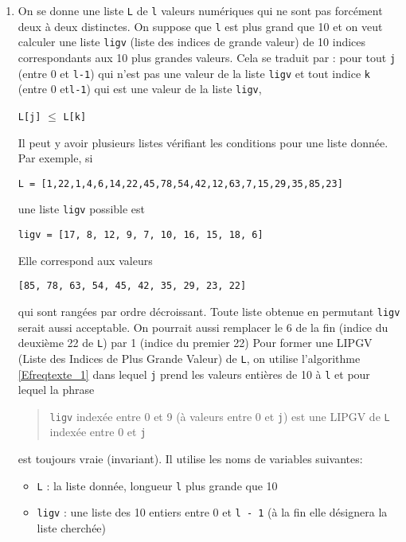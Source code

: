 \begin{enumerate}
  \item On se donne une liste \texttt{L} de \texttt{l} valeurs numériques qui ne sont pas forcément deux à deux distinctes. On suppose que \texttt{l} est plus grand que 10 et on veut calculer une liste \texttt{ligv} (liste des indices de grande valeur) de 10 indices correspondants aux 10 plus grandes valeurs. \newline
  Cela se traduit par : pour tout \texttt{j} (entre 0 et \texttt{l-1}) qui n'est pas une valeur de la liste \texttt{ligv} et tout indice \texttt{k} (entre 0 et\texttt{l-1}) qui est une valeur de la liste \texttt{ligv}, 
  \begin{center}
    \texttt{L[j]} $\leq$ \texttt{L[k]} 
  \end{center}
Il peut y avoir plusieurs listes vérifiant les conditions pour une liste donnée. Par exemple, si
\begin{center}
  \verb|L = [1,22,1,4,6,14,22,45,78,54,42,12,63,7,15,29,35,85,23]|  
\end{center}
une liste \texttt{ligv} possible est
\begin{center}
  \verb|ligv = [17, 8, 12, 9, 7, 10, 16, 15, 18, 6]|
\end{center}
Elle correspond aux valeurs
\begin{center}
\verb|[85, 78, 63, 54, 45, 42, 35, 29, 23, 22]|  
\end{center}
qui sont rangées par ordre décroissant.\newline
Toute liste obtenue en permutant \texttt{ligv} serait aussi acceptable. On pourrait aussi remplacer le 6 de la fin (indice du deuxième 22 de \texttt{L}) par 1 (indice du premier 22)\newline  
Pour former une LIPGV (Liste des Indices de Plus Grande Valeur) de \texttt{L}, on utilise l'algorithme \ref{Efreqtexte_1} dans lequel \texttt{j} prend les valeurs entières de 10 à \texttt{l} et pour lequel la phrase
\begin{quote}
 \texttt{ligv} indexée entre 0 et 9 (à valeurs entre 0 et \texttt{j}) est une LIPGV de \texttt{L} indexée entre 0 et \texttt{j}
\end{quote}
est toujours vraie (invariant). Il utilise les noms de variables suivantes:
\begin{itemize}
  \item \texttt{L} : la liste donnée, longueur \texttt{l} plus grande que 10
  \item \texttt{ligv} : une liste des 10 entiers entre 0 et \texttt{l - 1} (à la fin elle désignera la liste cherchée)  

\end{itemize}
\end{enumerate}
